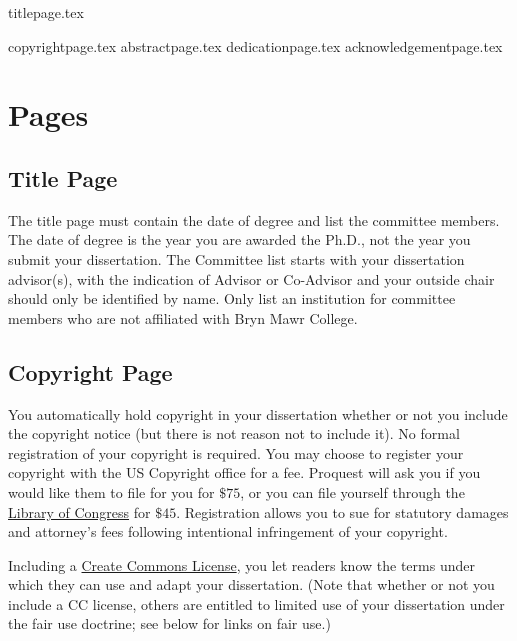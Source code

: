 \documentclass[12pt]{report}
\begin{document}
{titlepage.tex} %

{copyrightpage.tex}
{abstractpage.tex}
\setcounter{page}{2}
{dedicationpage.tex}
{acknowledgementpage.tex}
\tableofcontents
\newpage
\listoffigures
{}
\newpage
\listoftables
{}
\newpage
\listofappendices
\newpage
\chapter{Pages}
\section{Title Page}
The title page must contain the date of degree and list the committee members. The date of degree is the year you are awarded the Ph.D., not the year you submit your dissertation. The Committee list starts with your dissertation advisor(s), with the indication of Advisor or Co-Advisor and your outside chair should only be identified by name. Only list an institution for committee members who are not affiliated with Bryn Mawr College.
\section{Copyright Page}
You automatically hold copyright in your dissertation whether or not you include the copyright notice (but there is not reason not to include it). No formal registration of your copyright is required. You may choose to register your copyright with the US Copyright office for a fee. Proquest will ask you if you would like them to file for you for $\$75$, or you can file yourself through the \href{https://www.copyright.gov/registration/}{Library of Congress} for $\$45$. Registration allows you to sue for statutory damages and attorney's fees following intentional infringement of your copyright.

Including a \href{https://creativecommons.org/licenses/}{Create Commons License}, you let readers know the terms under which they can use and adapt your dissertation. (Note that whether or not you include a CC license, others are entitled to limited use of your dissertation under the fair use doctrine; see below for links on fair use.)
\end{document}
